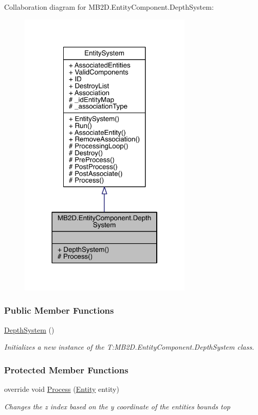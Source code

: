 Collaboration diagram for M\+B2\+D.\+Entity\+Component.\+Depth\+System\+:
\nopagebreak
\begin{figure}[H]
\begin{center}
\leavevmode
\includegraphics[width=233pt]{class_m_b2_d_1_1_entity_component_1_1_depth_system__coll__graph}
\end{center}
\end{figure}
\subsubsection*{Public Member Functions}
\begin{DoxyCompactItemize}
\item 
\hyperlink{class_m_b2_d_1_1_entity_component_1_1_depth_system_a5a7f2fc4d65f99bb89624cbcd1d52d65}{Depth\+System} ()
\begin{DoxyCompactList}\small\item\em Initializes a new instance of the T\+:\+M\+B2\+D.\+Entity\+Component.\+Depth\+System class. \end{DoxyCompactList}\end{DoxyCompactItemize}
\subsubsection*{Protected Member Functions}
\begin{DoxyCompactItemize}
\item 
override void \hyperlink{class_m_b2_d_1_1_entity_component_1_1_depth_system_a738556bdf819c9c0d4082a323a502c58}{Process} (\hyperlink{class_m_b2_d_1_1_entity_component_1_1_entity}{Entity} entity)
\begin{DoxyCompactList}\small\item\em Changes the z index based on the y coordinate of the entities bounds top \end{DoxyCompactList}\end{DoxyCompactItemize}
